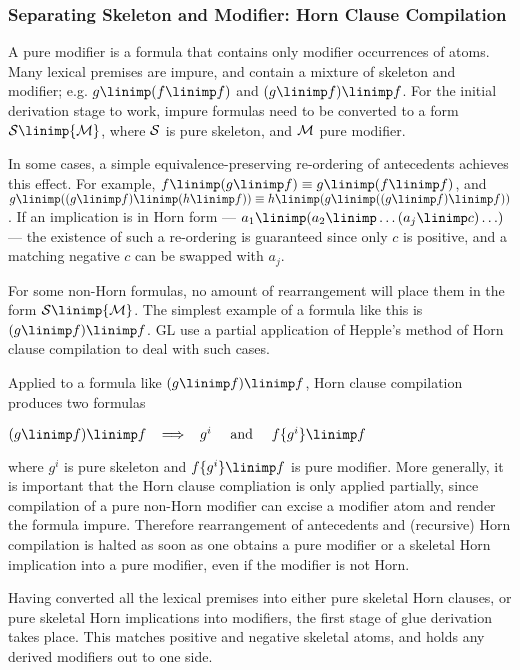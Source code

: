 \subsubsection{Separating Skeleton and Modifier: Horn Clause Compilation}

A pure modifier is a formula that contains only modifier occurrences
of atoms.  Many lexical premises 
 are impure, and contain a mixture of skeleton and
modifier; e.g. $g\linimp(f\linimp f)$
and $(g\linimp f)\linimp f$. For the initial derivation stage to work,
impure formulas need to be converted to a form ${\cal S}\linimp {\cal
M}$, where ${\cal S}$ is pure skeleton, and ${\cal M}$ pure modifier.

In some cases, a simple equivalence-preserving re-ordering of
antecedents achieves this effect. For example,
$f\linimp(g\linimp f) \equiv g\linimp(f\linimp f)$, and 
$g\linimp((g\linimp f)\linimp (h\linimp f)) \equiv
h\linimp (g\linimp((g\linimp f)\linimp  f))$. If an implication is
in Horn form --- $a_1\linimp (a_2\linimp \ldots (a_j\linimp c)\ldots)$ --- the
existence of such a re-ordering is guaranteed since only $c$ is
positive, and a matching negative $c$ can be swapped with $a_j$.

For some non-Horn formulas, no amount of rearrangement will place them
in the form ${\cal S}\linimp {\cal M}$.  The simplest example of
a formula like this is $(g\linimp f)\linimp f$.  GL use a partial
application of Hepple's method of Horn clause compilation to deal with
such cases.

Applied to a formula like $(g\linimp f)\linimp f$, Horn clause
compilation produces two formulas

\smallskip
\hspace*{5em}$(g\linimp f)\linimp f \;\;\;
\Longrightarrow \;\;\; g^i \mbox{\hspace*{1em} and \hspace*{1em}}
f\{g^i\}\linimp f$

\smallskip\noindent
where $g^i$ is pure skeleton and $f\{g^i\}\linimp f$ is pure modifier.
More generally, it is important that the Horn clause compliation is only
applied partially, since compilation of a pure non-Horn modifier can excise
a modifier atom and render the formula impure.  Therefore rearrangement of
antecedents and (recursive) Horn compilation is halted as soon as one obtains
a pure modifier or a skeletal Horn implication into a pure modifier, even if
the modifier is not Horn.

Having converted all the lexical premises into either pure skeletal
Horn clauses, or pure skeletal Horn implications into modifiers, the
first stage of glue derivation takes place.  This matches positive
and negative skeletal atoms, and holds  any derived modifiers out to 
one side.

